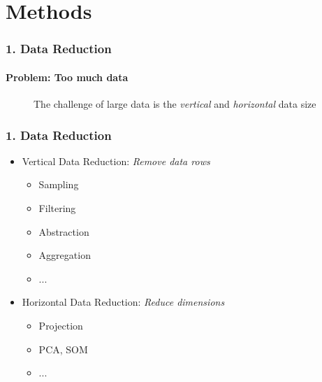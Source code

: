 \section{Methods}

\begin{frame}
	\frametitle{1. Data Reduction}
	\framesubtitle{Problem: Too much data}
	\begin{figure}
	    \centering
	    \caption{The challenge of large data is the \textit{vertical} and \textit{horizontal} data size}
	    \label{fig:toolarge}
	\end{figure}
\end{frame}

\begin{frame}
	\frametitle{1. Data Reduction}
	\begin{itemize}
		\item Vertical Data Reduction: \textit{Remove data rows}
		\begin{itemize}
		    \item Sampling
		    \item Filtering
		    \item Abstraction
		    \item Aggregation
		    \item ...
		\end{itemize}
		\item Horizontal Data Reduction: \textit{Reduce dimensions}
		\begin{itemize}
		    \item Projection
		    \item PCA, SOM
		    \item ...
		\end{itemize}
	\end{itemize}
\end{frame}

